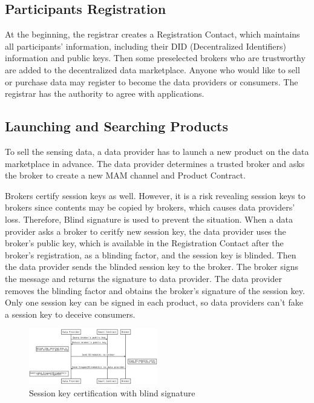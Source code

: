 \documentclass[journal,a4paper]{IEEEtran}
\begin{document}
\subsection{Participants Registration}
At the beginning, the registrar creates a Registration Contact, which maintains all participants' information, including their DID (Decentralized Identifiers) information and public keys. Then some preselected brokers who are trustworthy are added to the decentralized data marketplace. Anyone who would like to sell or purchase data may register to become the data providers or consumers. The registrar has the authority to agree with applications.

\subsection{Launching and Searching Products}
To sell the sensing data, a data provider has to launch a new product on the data marketplace in advance. The data provider determines a trusted broker and asks the broker to create a new MAM channel and Product Contract.

Brokers certify session keys as well. However, it is a risk revealing session keys to brokers since contents may be copied by brokers, which causes data providers' loss. Therefore, Blind signature is used to prevent the situation. When a data provider asks a broker to ceritfy new session key, the data provider uses the broker's public key, which is available in the Registration Contact after the broker's registration, as a blinding factor, and the session key is blinded. Then the data provider sends the blinded session key to the broker. The broker signs the message and returns the signature to data provider. The data provider removes the blinding factor and obtains the broker's signature of the session key. Only one session key can be signed in each product, so data providers can't fake a session key to deceive consumers.

\begin{figure}[h]
	\centering
	\includegraphics[width=0.5\textwidth]{key_certification}
	\caption{Session key certification with blind signature}
	\label{fig:key_certification}
\end{figure}
\end{document}
